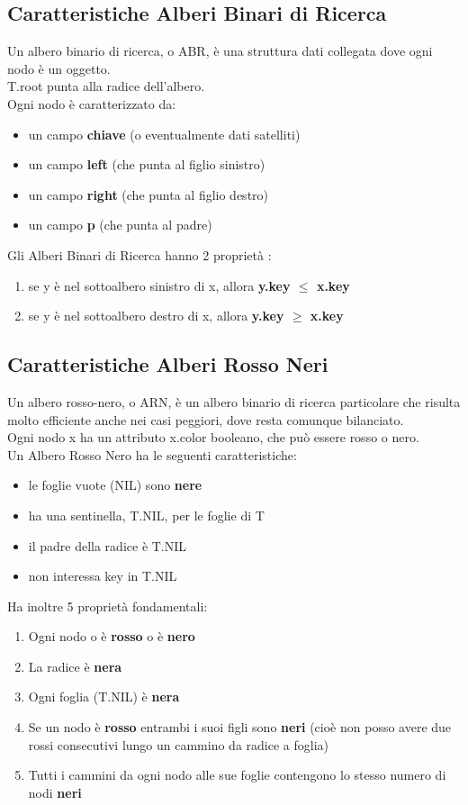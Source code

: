 \documentclass[12pt]{article}
\begin{document}
\subsection{Caratteristiche Alberi Binari di Ricerca}
Un albero binario di ricerca, o ABR, è una struttura dati collegata dove ogni nodo è un oggetto.
\\
T.root punta alla radice dell'albero.
\\
Ogni nodo è caratterizzato da:
\begin{itemize}
\item un campo \textbf{chiave} (o eventualmente dati satelliti)
\item un campo \textbf{left} (che punta al figlio sinistro)
\item un campo \textbf{right} (che punta al figlio destro)
\item un campo \textbf{p} (che punta al padre)
\end{itemize}
Gli Alberi Binari di Ricerca hanno 2 proprietà :
\begin{enumerate}
\item se y è nel sottoalbero sinistro di x, allora \textbf{y.key $\leq$ x.key}
\item se y è nel sottoalbero destro di x, allora \textbf{y.key $\geq$ x.key}
\end{enumerate}
\subsection{Caratteristiche Alberi Rosso Neri}
Un albero rosso-nero, o ARN, è un albero binario di ricerca particolare che risulta molto efficiente anche nei casi peggiori, dove resta comunque bilanciato.
\\
Ogni nodo x ha un attributo x.color booleano, che può essere rosso o nero. 
\\ 
Un Albero Rosso Nero ha le seguenti caratteristiche:
\begin{itemize}
\item le foglie vuote (NIL) sono \textbf{nere}
\item ha una sentinella, T.NIL, per le foglie di T
\item il padre della radice è T.NIL
\item non interessa key in T.NIL
\end{itemize}

\noindent
Ha inoltre 5 proprietà fondamentali:
\begin{enumerate}
\item Ogni nodo o è {\textbf{rosso}} o è \textbf{nero}
\item La radice è \textbf{nera}
\item Ogni foglia (T.NIL) è \textbf{nera}
\item Se un nodo è {\textbf{rosso}} entrambi i suoi figli sono \textbf{neri}
			(cioè non posso avere due rossi consecutivi lungo un cammino da radice a foglia)
\item Tutti i cammini da ogni nodo alle sue foglie contengono lo stesso numero di nodi \textbf{neri}
\end{enumerate}
\end{document}
